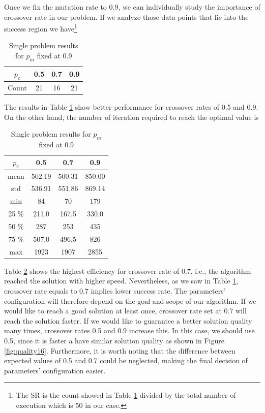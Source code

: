 \documentclass[10pt,a4paper]{article}
\begin{document}
Once we fix the mutation rate to 0.9, we can individually study the importance of crossover rate in our problem. If we analyze those data points that lie into the success region we have\footnote{The SR is the count showed in Table \ref{tab:results16} divided by the total number of execution which is 50 in our case.}
\begin{table}[h!]
    \centering
    \begin{tabular}{|c|ccc|}
        \hline
        $p_c$ & 0.5 & 0.7 & 0.9 \\
        \hline
        \hline
        Count & 21 & 16 & 21 \\
        \hline
    \end{tabular}
    \caption{Single problem results for $p_m$ fixed at 0.9}
    \label{tab:results16}
\end{table}
\newpage
The results in Table \ref{tab:results16} show better performance for crossover rates of 0.5 and 0.9. On the other hand, the number of iteration required to reach the optimal value is 
\begin{table}[h!]
    \centering
    \begin{tabular}{|c|ccc|}
        \hline
        $p_c$ & 0.5 & 0.7 & 0.9 \\
        \hline
        \hline
        mean & 502.19 & 500.31 & 850.00 \\
        \hline
        std & 536.91 & 551.86 & 869.14 \\
        \hline
        min & 84 & 70 & 179 \\
        \hline 
        25 \% & 211.0 & 167.5 & 330.0 \\
        \hline
        50 \% & 287 & 253 & 435 \\
        \hline
        75 \% & 507.0 & 496.5 & 826 \\
        \hline
        max & 1923 & 1907 & 2855 \\
        \hline
    \end{tabular}
    \caption{Single problem results for $p_m$ fixed at 0.9}
    \label{tab:iters16}
\end{table}

Table \ref{tab:iters16} shows the highest efficiency for crossover rate of 0.7, i.e., the algorithm reached the solution with higher speed. Nevertheless, as we saw in Table \ref{tab:results16}, crossover rate equals to 0.7 implies lower success rate. The parameters' configuration will therefore depend on the goal and scope of our algorithm. If we would like to reach a good solution at least once, crossover rate set at 0.7 will reach the solution faster. If we would like to guarantee a better solution quality many times, crossover rates 0.5 and 0.9 increase this. In this case, we should use 0.5, since it is faster a have similar solution quality as shown in Figure \ref{fig:quality16}. Furthermore, it is worth noting that the difference between expected values of 0.5 and 0.7 could be neglected, making the final decision of parameters' configuration easier.
\end{document}
